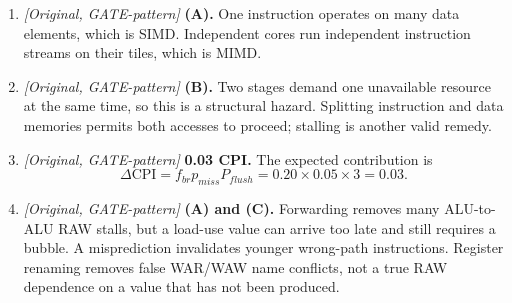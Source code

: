\documentclass[11pt]{article}
\begin{document}
\begin{enumerate}
\item[\textbf{Q5}] \textit{[Original, GATE-pattern]} \textbf{(A).} One
instruction operates on many data elements, which is SIMD. Independent cores
run independent instruction streams on their tiles, which is MIMD.

\item[\textbf{Q6}] \textit{[Original, GATE-pattern]} \textbf{(B).} Two
stages demand one unavailable resource at the same time, so this is a
structural hazard. Splitting instruction and data memories permits both
accesses to proceed; stalling is another valid remedy.

\item[\textbf{Q7}] \textit{[Original, GATE-pattern]} \textbf{0.03 CPI.}
The expected contribution is
\[
  \Delta\mathrm{CPI}=f_{br}p_{miss}P_{flush}
  =0.20\times0.05\times3=0.03.
\]

\item[\textbf{Q8}] \textit{[Original, GATE-pattern]} \textbf{(A) and (C).}
Forwarding removes many ALU-to-ALU RAW stalls, but a load-use value can arrive
too late and still requires a bubble. A misprediction invalidates younger
wrong-path instructions. Register renaming removes false WAR/WAW name
conflicts, not a true RAW dependence on a value that has not been produced.
\end{enumerate}
\end{document}
